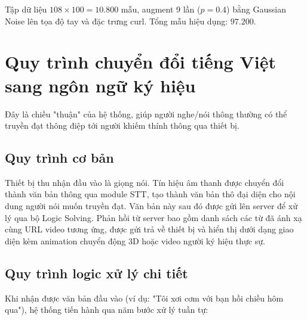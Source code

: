 Tập dữ liệu $108 \times 100 = 10.800$ mẫu, augment 9 lần ($p = 0.4$) bằng Gaussian Noise lên tọa độ tay và đặc trưng curl. Tổng mẫu hiệu dụng: $97.200$.


\section{Quy trình chuyển đổi tiếng Việt sang ngôn ngữ ký hiệu}

Đây là chiều "thuận" của hệ thống, giúp người nghe/nói thông thường có thể
truyền đạt thông điệp tới người khiếm thính thông qua thiết bị.

\subsection{Quy trình cơ bản}

Thiết bị thu nhận đầu vào là giọng nói. Tín hiệu âm thanh được chuyển đổi thành
văn bản thông qua module STT, tạo thành văn bản thô đại diện
cho nội dung người nói muốn truyền đạt. Văn bản này sau đó được gửi lên server
để xử lý qua bộ Logic Solving. Phản hồi từ server bao gồm danh sách các từ đã
ánh xạ cùng URL video tương ứng, được gửi trả về thiết bị và hiển thị dưới dạng
giao diện kèm animation chuyển động 3D hoặc video người ký hiệu thực sự.

\subsection{Quy trình logic xử lý chi tiết}

Khi nhận được văn bản đầu vào (ví dụ: "Tôi xơi cơm với bạn hồi chiều hôm qua"),
hệ thống tiến hành qua năm bước xử lý tuần tự:

